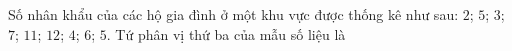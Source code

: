 \begin{ex}
Số nhân khẩu của các hộ gia đình ở một khu vực được thống kê như sau: $2$; $5$; $3$; $7$; $11$; $12$; $4$; $6$; $5$. Tứ phân vị thứ ba của mẫu số liệu là
\end{ex}
